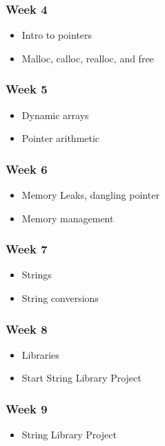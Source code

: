 \documentclass[a4paper,12pt]{report}
\begin{document}
\subsubsection*{Week 4}
\begin{itemize}
\item Intro to pointers
\item Malloc, calloc, realloc, and free
\end{itemize}

\subsubsection*{Week 5}
\begin{itemize}
\item Dynamic arrays
\item Pointer arithmetic
\end{itemize}

\subsubsection*{Week 6}
\begin{itemize}
\item Memory Leaks, dangling pointer
\item Memory management 
\end{itemize}

\subsubsection*{Week 7}
\begin{itemize}
\item Strings
\item String conversions
\end{itemize}

\subsubsection*{Week 8}
\begin{itemize}
\item Libraries
\item Start String Library Project
\end{itemize}

\subsubsection*{Week 9}
\begin{itemize}
\item String Library Project
\end{itemize}
\end{document}
